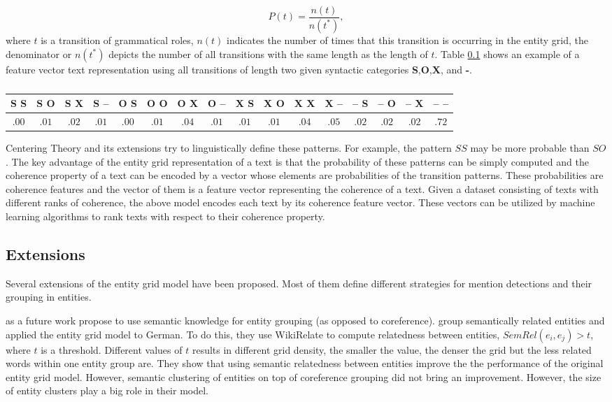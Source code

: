\begin{equation}
P(t) = \frac{n(t)}{n(t^*)},
\end{equation}
where $t$ is a transition of grammatical roles, $n(t)$ indicates the number of times that this transition is occurring in the entity grid, the denominator or $n(t^*)$ depicts the number of all transitions with the same length as the length of $t$. 
Table \ref{} shows an example of a feature vector text representation using all transitions of length two given syntactic categories \textbf{S},\textbf{O},\textbf{X}, and \textbf{-}.

\begin{table}
\centering
\begin{tabular}{@{}cccccccccccccccc@{}}
\hline
S S & S O  & S X & S -- & O S  & O O  & O X  & O -- & X S  & X O  & X X & 	X -- & -- S  & -- O  & -- X & -- -- \\\hline
$.00$ & $.01$  & $.02$ & $.01$  & $.00$  & $.01$  & $.04$  & $.01$  & $.01$  & $.01$  & $.04$ & $.05$  & $.02$  & $.02$  & $.02$ & $.72$ \\
\hline
\end{tabular}
\caption{}
\end{table}

Centering Theory and its extensions try to linguistically define these patterns. 
For example, the pattern $SS$ may be more probable than $SO$.
The key advantage of the entity grid representation of a text is that the probability of these patterns can be simply computed and
the coherence property of a text can be encoded by a vector whose elements are probabilities of the transition patterns. 
These probabilities are coherence features and the vector of them is a feature vector representing the coherence of a text. 
Given a dataset consisting of texts with different ranks of coherence, the above model encodes each text by its coherence feature vector.  
These vectors can be utilized by machine learning algorithms to rank texts with respect to their coherence property. 

\subsection{Extensions}
%
Several extensions of the entity grid model have been proposed. 
Most of them define different strategies for mention detections and their grouping in entities. 

 as a future work propose to use semantic knowledge for entity grouping (as opposed to coreference). 
 group semantically related  entities and applied the entity grid model to German. 
To do this, they use WikiRelate \cite{strube.aaai06} to compute relatedness between entities, $SemRel(e_i,e_j) >t$, where $t$ is a threshold.
Different values of $t$ results in different grid density, the smaller the value, the denser the grid but the less related words within one entity group are. 
They show that using semantic relatedness between entities improve the the performance of the original entity grid model.  
However, semantic clustering of entities on top of coreference grouping did not bring an improvement. 
However, the size of entity clusters play a big role in their model. 

